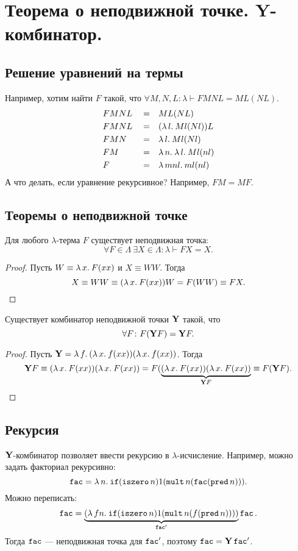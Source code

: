 \documentclass[11pt,a4paper]{article}
\begin{document}
\section{Теорема о неподвижной точке. Y-комбинатор.}
\subsection{Решение уравнений на термы}
Например, хотим найти $ F$ такой, что $ \forall M, N, L\colon \lambda \vdash FMNL = ML(NL)$.
\[
\begin{aligned}
	& FMNL && = && ML(NL) \\
	& FMNL && = && (\lambda\,{l}.\:{Ml(Nl)})L \\
	& FMN && = && \lambda\,{l}.\:{Ml(Nl)} \\
	& FM && = && \lambda\,{n}.\:{\lambda\,{l}.\:{Ml(nl)}} \\
	& F && = && \lambda\,{mnl}.\:{ml(nl)}
\end{aligned}
\]
А что делать, если уравнение рекурсивное? Например, $ FM = MF$.
\subsection{Теоремы о неподвижной точке}
\begin{thm}
    Для любого $ \lambda$-терма $ F$ существует неподвижная точка:
	\[
	\forall F \in \Lambda ~ \exists X \in \Lambda\colon \lambda \vdash FX = X
	.\] 
\end{thm}
\begin{proof}
	Пусть $ W \equiv \lambda\,{x}.\:{F(x x)}$ и $ X \equiv WW$. Тогда
	\[
		X \equiv WW \equiv (\lambda\,{x}.\:{F(x x)})W = F(WW) \equiv F X
	.\] 
\end{proof}
\begin{thm}
	Существует комбинатор неподвижной точки $\textbf{Y}$ такой, что
	 \[
		 \forall F\colon F(\textbf{Y} F) = \textbf{Y} F
	.\] 
\end{thm}
\begin{proof}
	Пусть $ \textbf{Y} = \lambda\,{f}.\:{(\lambda\,{x}.\:{f(xx)})(\lambda\,{x}.\:{f(x x)})}$.
	Тогда
	\[
		\textbf{Y} F \equiv (\lambda\,{x}.\:{F(x x)})(\lambda\,{x}.\:{F(x x)}) = F(\underbrace{(\lambda\,{x}.\:{F(x x)})(\lambda\,{x}.\:{F(x x)})}_{\textbf{Y} F} \equiv F(\textbf{Y} F)
	.\] 
\end{proof}

\subsection{Рекурсия}
$\textbf{Y}$-комбинатор позволяет ввести рекурсию в  $ \lambda$-исчисление.
Например, можно задать факториал рекурсивно:
\[
	\operatorname{\mathtt{fac}} = \lambda\,{n}.\:{\operatorname{\mathtt{if}} (\operatorname{\mathtt{iszero}} n) 1 (\operatorname{\mathtt{mult}} n (\operatorname{\mathtt{fac}} (\operatorname{\mathtt{pred}} n)))}
.\] 
Можно переписать:
\[
	\operatorname{\mathtt{fac}} = \underbrace{(\lambda\,{f n}.\:{\operatorname{\mathtt{if}} (\operatorname{\mathtt{iszero}} n) 1 (\operatorname{\mathtt{mult}} n (f (\operatorname{\mathtt{pred}} n))))}}_{\operatorname{\mathtt{fac}}'} \operatorname{\mathtt{fac}}
.\] 
Тогда $ \operatorname{\mathtt{fac}}$ --- неподвижная точка для $ \operatorname{\mathtt{fac}}'$, поэтому  $ \operatorname{\mathtt{fac}} = \textbf{Y} \operatorname{\mathtt{fac}}'$.
\end{document}
